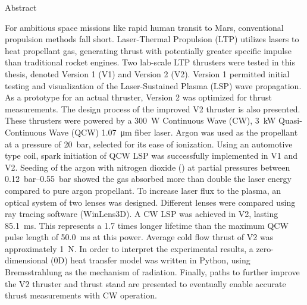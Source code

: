 \begin{plainchp}{Abstract}
    
    For ambitious space missions like rapid human transit to Mars, conventional propulsion methods fall short. Laser-Thermal Propulsion (LTP) utilizes lasers to heat propellant gas, generating thrust with potentially greater specific impulse than traditional rocket engines. Two lab-scale LTP thrusters were tested in this thesis, denoted Version 1 (V1) and Version 2 (V2). Version 1 permitted initial testing and visualization of the Laser-Sustained Plasma (LSP) wave propagation. As a prototype for an actual thruster, Version 2 was optimized for thrust measurements. The design process of the improved V2 thruster is also presented. These thrusters were powered by a \qty{300}{W} Continuous Wave (CW), \qty{3}{kW} Quasi-Continuous Wave (QCW) \qty{1.07}{μm} fiber laser. Argon was used as the propellant at a pressure of \qty{20}{bar}, selected for its ease of ionization. Using an automotive type coil, spark initiation of QCW LSP was successfully implemented in V1 and V2. Seeding of the argon with nitrogen dioxide () at partial pressures between \qtyrange{.12}{.55}{bar} showed the gas absorbed more than double the laser energy compared to pure argon propellant. To increase laser flux to the plasma, an optical system of two lenses was designed. Different lenses were compared using ray tracing software (WinLens3D). A CW LSP was achieved in V2, lasting \qty{85.1}{ms}. This represents a 1.7 times longer lifetime than the maximum QCW pulse length of \qty{50.0}{ms} at this power. Average cold flow thrust of V2 was approximately \qty{1}{N}. In order to interpret the experimental results, a zero-dimensional (0D) heat transfer model was written in Python, using Bremsstrahlung as the mechanism of radiation. Finally, paths to further improve the V2 thruster and thrust stand are presented to eventually enable accurate thrust measurements with CW operation.

\end{plainchp}